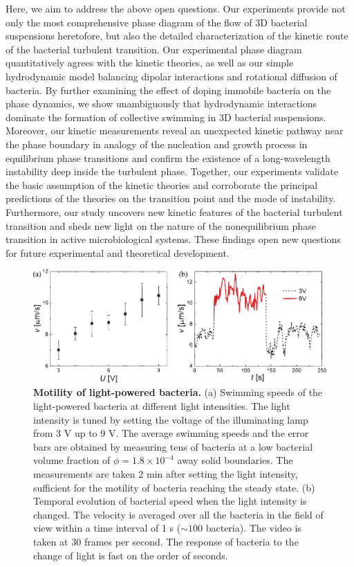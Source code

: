 Here, we aim to address the above open questions. Our experiments provide not only the most comprehensive phase diagram of the flow of 3D bacterial suspensions heretofore, but also the detailed characterization of the kinetic route of the bacterial turbulent transition. Our experimental phase diagram quantitatively agrees with the kinetic theories, as well as our simple hydrodynamic model balancing dipolar interactions and rotational diffusion of bacteria. By further examining the effect of doping immobile bacteria on the phase dynamics, we show unambiguously that hydrodynamic interactions dominate the formation of collective swimming in 3D bacterial suspensions. Moreover, our kinetic measurements reveal an unexpected kinetic pathway near the phase boundary in analogy of the nucleation and growth process in equilibrium phase transitions and confirm the existence of a long-wavelength instability deep inside the turbulent phase. Together, our experiments validate the basic assumption of the kinetic theories and corroborate the principal predictions of the theories on the transition point and the mode of instability. Furthermore, our study uncovers new kinetic features of the bacterial turbulent transition and sheds new light on the nature of the nonequilibrium phase transition in active microbiological systems. These findings open new questions for future experimental and theoretical development.

\begin{figure}[!p]
	\begin{center}
	\includegraphics[width=5.5 in]{Figs/4-Emergence/S1.pdf}
	\end{center}
	\caption[Motility of Light-powered Bacteria]
	{
	\textbf{Motility of light-powered bacteria.}
  (a) Swimming speeds of the light-powered bacteria at different light intensities.
  The light intensity is tuned by setting the voltage of the illuminating lamp from 3 V up to 9 V.
  The average swimming speeds and the error bars are obtained by measuring tens of bacteria at a low bacterial volume fraction of $\phi=1.8\times 10^{-4}$ away solid boundaries. The measurements are taken 2 min after setting the light intensity, sufficient for the motility of bacteria reaching the steady state.
  (b) Temporal evolution of bacterial speed when the light intensity is changed.
  The velocity is averaged over all the bacteria in the field of view within a time interval of 1 s ($\sim 100$ bacteria).
  The video is taken at 30 frames per second. The response of bacteria to the change of light is fast on the order of seconds.
	}
	\label{fig:4-motility}
\end{figure}



